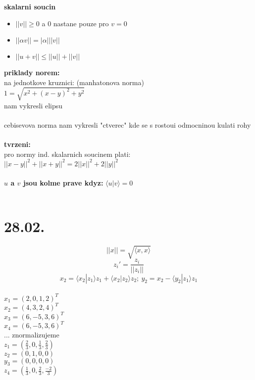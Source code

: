 \documentclass[a4paper]{article}
\begin{document}
\textbf{skalarni soucin}\\
\begin{itemize}
    \item $||v|| \geq 0$ a $0$ nastane pouze pro $v=0$
    \item $||\alpha v|| = |\alpha| ||v||$
    \item $||u+v|| \leq ||u|| + ||v||$ 
\end{itemize}

\textbf{priklady norem:}\\
na jednotkove kruznici: (manhatonova norma)\\
$1=\sqrt{x^2+(x-y)^2+y^2}$\\
nam vykresli elipsu\\
\\
cebisevova norma nam vykresli "ctverec" kde se s rostoui odmocninou kulati rohy\\
\\
\textbf{tvrzeni:}\\
pro normy ind. skalarnich soucinem plati:\\
$ ||x-y||^2 + ||x+y||^2 = 2||x||^2 + 2||y||^2 $\\
\\
\textbf{$u$ a $v$ jsou kolme prave kdyz:}
$\langle u | v \rangle = 0$\\
\\
\section*{28.02.}
$$||x|| = \sqrt{\langle x,x \rangle}$$
$$z_i' = \frac{z_i}{||z_i||}$$
$$x_2 = \langle x_2 | z_1 \rangle z_1 + \langle{ x_2 | z_2 \rangle z_2};~y_2=x_2 - \langle y_2|z_1\rangle z_1$$
\\
$x_1 = (2,0,1,2)^T$\\
$x_2 = (4,3,2,4)^T$\\
$x_3 = (6,-5,3,6)^T$\\
$x_4 = (6,-5,3,6)^T$\\
... znormalizujeme\\
$z_1 = (\frac{2}{3}, 0, \frac{1}{3}, \frac{2}{3})$\\
$z_2 = (0,1,0,0)$\\
$y_3 = (0,0,0,0)$\\
$z_4 = (\frac{1}{3}, 0, \frac{2}{3}, \frac{-2}{3})$\\
\\
\end{document}

